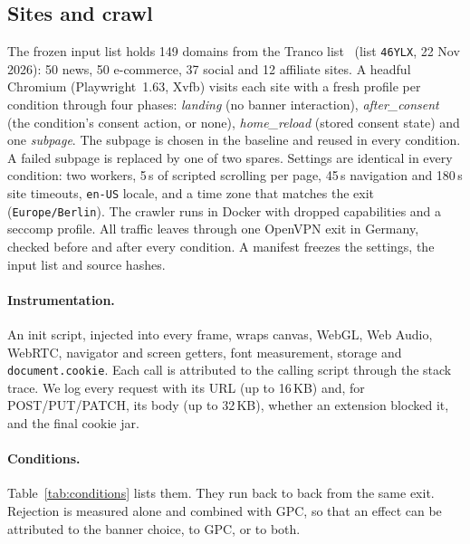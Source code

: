 \documentclass[sigconf,review,anonymous]{acmart}
\begin{document}
\subsection{Sites and crawl}
The frozen input list holds 149 domains from the Tranco list~\cite{lepochat2019tranco} (list
\texttt{46YLX}, 22 Nov 2026): 50 news, 50 e-commerce, 37 social and 12 affiliate sites. A headful
Chromium (Playwright~1.63, Xvfb) visits each site with a fresh profile per condition through four
phases: \emph{landing} (no banner interaction), \emph{after\_consent} (the condition's consent
action, or none), \emph{home\_reload} (stored consent state) and one \emph{subpage}. The subpage
is chosen in the baseline and reused in every condition. A failed subpage is replaced by one of
two spares. Settings are identical in every condition: two workers, 5\,s of scripted scrolling
per page, 45\,s navigation and 180\,s site timeouts, \texttt{en-US} locale, and a time zone that
matches the exit (\texttt{Europe/Berlin}). The crawler runs in Docker with dropped capabilities
and a seccomp profile. All traffic leaves through one OpenVPN exit in Germany, checked before and
after every condition. A manifest freezes the settings, the input list and source hashes.

\paragraph{Instrumentation.} An init script, injected into every frame, wraps canvas, WebGL, Web
Audio, WebRTC, navigator and screen getters, font measurement, storage and \texttt{document.cookie}.
Each call is attributed to the calling script through the stack trace. We log every request
with its URL (up to 16\,KB) and, for POST/PUT/PATCH, its body (up to 32\,KB), whether an
extension blocked it, and the final cookie jar.

\paragraph{Conditions.} Table~\ref{tab:conditions} lists them. They run back to back from the
same exit. Rejection is measured alone and combined with GPC, so that an effect can be attributed
to the banner choice, to GPC, or to both.
\end{document}
